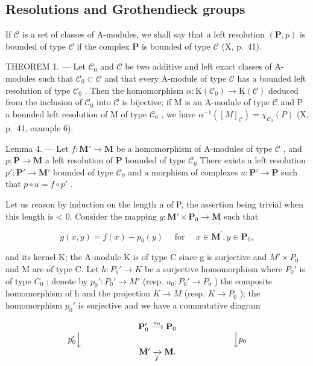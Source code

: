 \subsection{Resolutions and Grothendieck groups}

If \(\mathcal{C}\) is a set of classes of A-modules, we shall say that a left resolution \((\mathbf{P}, p)\) is bounded of type \(\mathcal{C}\) if the complex \(\mathbf{P}\) is bounded of type \(\mathcal{C}\) (X, p.~41).

THEOREM 1. --- Let \(\mathcal{C}_{0}\) and \(\mathcal{C}\) be two additive and left exact classes of A-modules such that \(\mathcal{C}_{0} \subset \mathcal{C}\) and that every A-module of type \(\mathcal{C}\) has a bounded left resolution of type \(\mathcal{C}_{0}\) . Then the homomorphism \(\alpha : \mathrm{K}(\mathcal{C}_{0}) \to \mathrm{K}(\mathcal{C})\) deduced from the inclusion of \(\mathcal{C}_{0}\) into \(\mathcal{C}\) is bijective; if M is an A-module of type \(\mathcal{C}\) and P a bounded left resolution of M of type \(\mathcal{C}_{0}\) , we have \(\alpha^{-1}([M]_{\mathcal{C}}) = \chi_{\mathcal{C}_{0}}(P)\) (X, p.~41, example 6).

Lemma 4. --- Let \(f: \mathbf{M}' \to \mathbf{M}\) be a homomorphism of A-modules of type \(\mathcal{C}\) , and \(p: \mathbf{P} \to \mathbf{M}\) a left resolution of \(\mathbf{P}\) bounded of type \(\mathcal{C}_0\) There exists a left resolution \(p': \mathbf{P}' \to \mathbf{M}'\) bounded of type \(\mathcal{C}_0\) and a morphism of complexes \(u: \mathbf{P}' \to \mathbf{P}\) such that \(p \circ u = f \circ p'\) .

Let us reason by induction on the length n of P, the assertion being trivial when this length is \textless{} 0. Consider the mapping \(g: \mathbf{M}' \times \mathbf{P}_0 \to \mathbf{M}\) such that

\[
g (x, y) = f (x) - p _ {0} (y) \quad \text { for } \quad x \in \mathbf {M} ^ {\prime}, y \in \mathbf {P} _ {0},
\]

and its kernel K; the A-module K is of type C since g is surjective and \(M' \times P_{0}\) and M are of type C. Let \(h : P_{0}' \to K\) be a surjective homomorphism where \(P_{0}'\) is of type \(C_{0}\) ; denote by \(p_{0}' : P_{0}' \to M'\) (resp. \(u_{0} : P_{0}' \to P_{0}\) ) the composite homomorphism of h and the projection \(K \to M\) (resp. \(K \to P_{0}\) ); the homomorphism \(p_{0}'\) is surjective and we have a commutative diagram

\[
\begin{array}{c} \mathbf {P} _ {0} ^ {\prime} \xrightarrow {u _ {0}} \mathbf {P} _ {0} \\ p _ {0} ^ {\prime} \Big \downarrow \qquad \qquad \qquad \qquad \qquad \qquad \qquad \qquad \qquad \Big \downarrow p _ {0} \\ \mathbf {M} ^ {\prime} \xrightarrow [ f ]{} \mathbf {M}. \end{array}
\]

